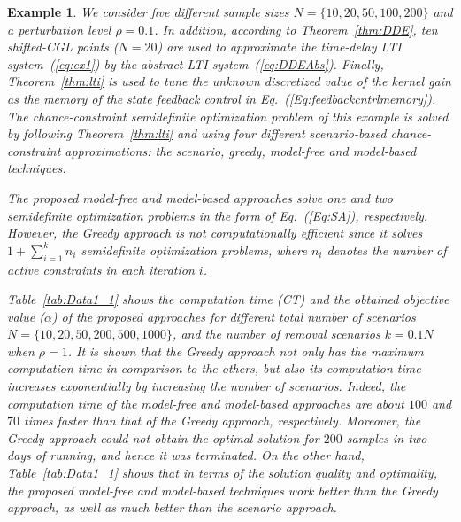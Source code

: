 \documentclass[journal]{IEEEtran}
\newtheorem{exmp}{Example}
\begin{document}
\begin{exmp}
	We consider five different sample sizes $ N=\{10,20,50,100,200\} $ and a perturbation level $\rho=0.1$. In addition, according to Theorem~\ref{thm:DDE}, ten shifted-CGL points ($ N=20 $) are used to approximate the time-delay LTI system~(\ref{eq:ex1}) by the abstract LTI system~(\ref{eq:DDEAbs}). Finally, Theorem~\ref{thm:lti} is used to tune the unknown discretized value of the kernel gain as the memory of the state feedback control in Eq.~(\ref{Eq:feedbackcntrlmemory}). The chance-constraint semidefinite optimization problem of this example is solved by following Theorem~\ref{thm:lti} and using four different scenario-based chance-constraint approximations: the scenario, greedy, model-free and model-based techniques.


	The proposed model-free and model-based approaches solve one and two semidefinite optimization problems in the form of Eq.~(\ref{Eq:SA}), respectively. However, the Greedy approach is not computationally efficient since it solves $1+ \sum_{i=1}^{k} n_i$ semidefinite optimization problems, where $n_i$ denotes the number of active constraints in each iteration $i$.

	Table~\ref{tab:Data1_1} shows the computation time (CT) and the obtained objective value ($ \alpha $) of the proposed approaches for different total number of scenarios $ N =\{10,20,50,200,500,1000\}$, and the number of removal scenarios $ k = 0.1N$ when $ \rho=1 $. It is shown that the Greedy approach not only has the maximum computation time in comparison to the others, but also its computation time increases exponentially by increasing the number of scenarios. Indeed, the computation time of the model-free and model-based approaches are about $ 100 $ and $ 70 $ times faster than that of the Greedy approach, respectively. Moreover, the Greedy approach could not obtain the optimal solution for $ 200 $ samples in two days of running, and hence it was terminated. On the other hand, Table~\ref{tab:Data1_1} shows that in terms of the solution quality and optimality, the proposed model-free and model-based techniques work better than the Greedy approach, as well as much better than the scenario approach.


	\begin{table*}[]


\end{table*}
\end{exmp}
\end{document}
